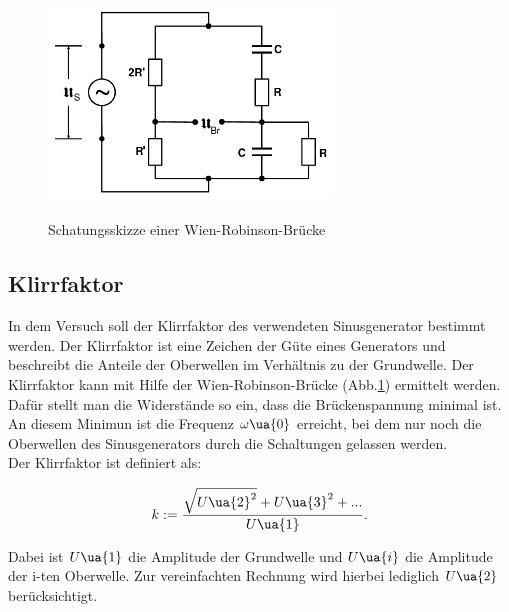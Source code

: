 \begin{figure}
  \includegraphics[width=7.50cm, height=6cm]{V302_Wien-Robinson_Brücke.png}
  \caption{Schatungsskizze einer Wien-Robinson-Brücke\cite{anleitung01}}
  \label{fig:Wien-Robinson-Brücke}
\end{figure}

\subsection{Klirrfaktor}

In dem Versuch soll der Klirrfaktor des verwendeten Sinusgenerator bestimmt werden.
Der Klirrfaktor ist eine Zeichen der Güte eines Generators und beschreibt die
Anteile der Oberwellen im Verhältnis zu der Grundwelle.
Der Klirrfaktor kann mit Hilfe der Wien-Robinson-Brücke (Abb.\ref{fig:Wien-Robinson-Brücke})
ermittelt werden. Dafür stellt man die Widerstände so ein, dass die Brückenspannung
minimal ist. An diesem Minimun ist die Frequenz $\omega\ua{0}$ erreicht, bei dem
nur noch die Oberwellen des Sinusgenerators durch die Schaltungen gelassen werden.\\
Der Klirrfaktor ist definiert als:

\begin{equation}
  \label{eqn:Klirrfaktor}
  k := \frac{\sqrt{U\ua{2}^2} + U\ua{3}^2 + ... }{U\ua{1}}.
\end{equation}

Dabei ist $U\ua{1}$ die Amplitude der Grundwelle und $U\ua{i}$ die Amplitude der
i-ten Oberwelle. Zur vereinfachten Rechnung wird hierbei lediglich $U\ua{2}$
berücksichtigt.

\newpage
\printbibliography


